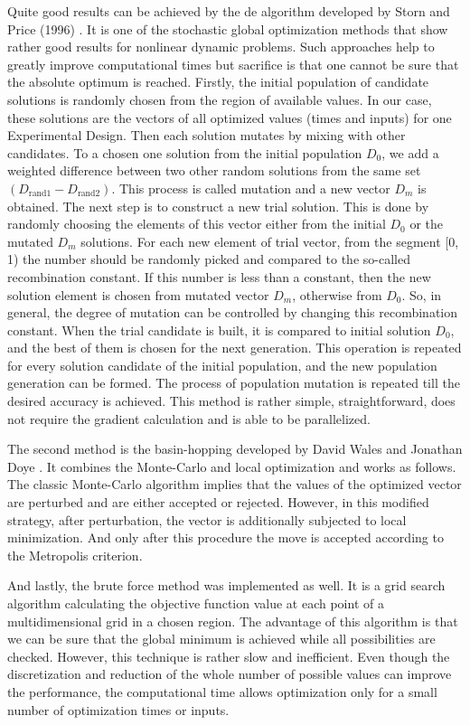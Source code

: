 \documentclass[10pt,A4paper]{article}
\begin{document}
Quite good results can be achieved by the \ac{de} algorithm developed by Storn and Price (1996) \cite{stornDifferentialEvolutionSimple1997}.
It is one of the stochastic global optimization methods that show rather good results for nonlinear dynamic problems.
Such approaches help to greatly improve computational times but sacrifice is that one cannot be sure that the absolute optimum is reached.
Firstly, the initial population of candidate solutions is randomly chosen from the region of available values.
In our case, these solutions are the vectors of all optimized values (times and inputs) for one Experimental Design.
Then each solution mutates by mixing with other candidates.
To a chosen one solution from the initial population $D_0$, we add a weighted difference between two other random solutions from the same set $(D_\text{rand1} - D_\text{rand2})$.
This process is called mutation and a new vector $D_m$ is obtained.
The next step is to construct a new trial solution.
This is done by randomly choosing the elements of this vector either from the initial $D_0$ or the mutated $D_m$ solutions.
For each new element of trial vector, from the segment [0, 1) the number should be randomly picked and compared to the so-called recombination constant.
If this number is less than a constant, then the new solution element is chosen from mutated vector $D_m$, otherwise from $D_0$.
So, in general, the degree of mutation can be controlled by changing this recombination constant.
When the trial candidate is built, it is compared to initial solution $D_0$, and the best of them is chosen for the next generation.
This operation is repeated for every solution candidate of the initial population, and the new population generation can be formed.
The process of population mutation is repeated till the desired accuracy is achieved.
This method is rather simple, straightforward, does not require the gradient calculation and is able to be parallelized.

The second method is the basin-hopping developed by David Wales and Jonathan Doye \cite{walesGlobalOptimizationBasinHopping1997}. 
It combines the Monte-Carlo and local optimization and works as follows. 
The classic Monte-Carlo algorithm implies that the values of the optimized vector are perturbed and are either accepted or rejected.
However, in this modified strategy, after perturbation, the vector is additionally subjected to local minimization.
And only after this procedure the move is accepted according to the Metropolis criterion.


And lastly, the brute force method was implemented as well.
It is a grid search algorithm calculating the objective function value at each point of a multidimensional grid in a chosen region.
The advantage of this algorithm is that we can be sure that the global minimum is achieved while all possibilities are checked.
However, this technique is rather slow and inefficient.
Even though the discretization and reduction of the whole number of possible values can improve the performance, the computational time allows optimization only for a small number of optimization times or inputs.
\end{document}
